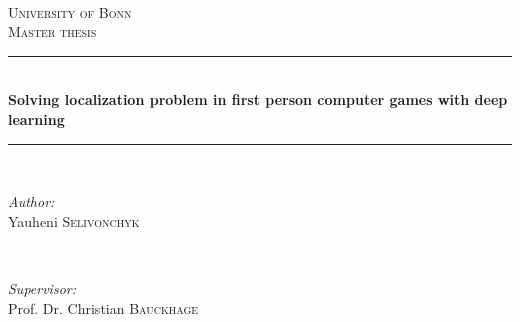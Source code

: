 \begin{titlepage}

\newcommand{\HRule}{\rule{\linewidth}{0.5mm}} %

\center %

\textsc{}\\[2cm]
\textsc{\LARGE University of Bonn}\\[3cm] %
\textsc{\Large Master thesis}\\[0.5cm] %


\HRule \\[0.4cm]
{ \huge \bfseries Solving localization problem in first person computer games with deep learning}\\[0.4cm] %
\HRule \\[1.5cm]


\begin{minipage}{0.4\textwidth}
  \begin{flushleft} \large
  \emph{Author:}\\
  Yauheni \textsc{Selivonchyk} %
  \end{flushleft}
\end{minipage}
~
\begin{minipage}{0.5\textwidth}
  \begin{flushright} \large
  \emph{Supervisor:} \\
  Prof. Dr. Christian \textsc{Bauckhage} %

  \end{flushright}
\end{minipage}\\[0.5cm]


\end{titlepage}
